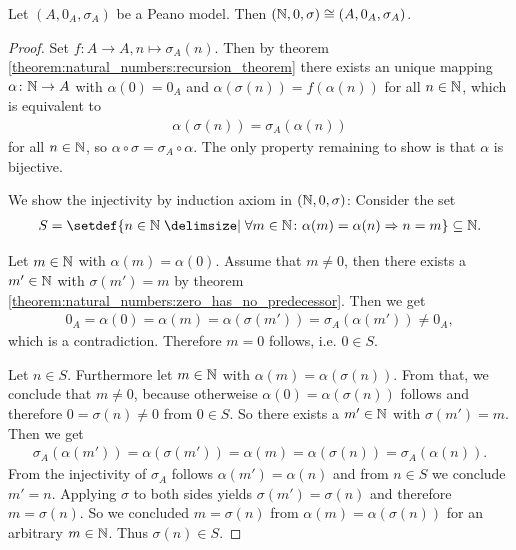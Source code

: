 \begin{theorem}
    Let $(A,0_A,\sigma_A)$ be a Peano model. Then $(\mathbb{N},0,\sigma)\cong(A,0_A,\sigma_A)$.
\end{theorem}

\begin{proof}
    Set $f\colon A\to A,n\mapsto\sigma_A(n)$. Then by theorem \ref{theorem:natural_numbers:recursion_theorem} there exists an unique mapping $\alpha\colon\mathbb{N}\to A$ with $\alpha(0)=0_A$ and $\alpha(\sigma(n))=f(\alpha(n))$ for all $n\in\mathbb{N}$, which is equivalent to \begin{align}\alpha(\sigma(n))=\sigma_A(\alpha(n))\end{align} for all $n\in\mathbb{N}$, so $\alpha\circ\sigma=\sigma_A\circ\alpha$. The only property remaining to show is that $\alpha$ is bijective.

     We show the injectivity by induction axiom in $(\mathbb{N},0,\sigma)$: Consider the set
    \begin{align}S=\setdef{n\in\setN\given \forall m\in\setN\colon \alpha(m)=\alpha(n)\Rightarrow n=m}\subseteq\setN.\end{align}
    
     Let $m\in\mathbb{N}$ with $\alpha(m)=\alpha(0)$. Assume that $m\neq 0$, then there exists a $m'\in\mathbb{N}$ with $\sigma(m')=m$ by theorem \ref{theorem:natural_numbers:zero_has_no_predecessor}. Then we get
    \begin{align}0_A=\alpha(0)=\alpha(m)=\alpha(\sigma(m'))=\sigma_A(\alpha(m'))\neq 0_A,\end{align}
    which is a contradiction. Therefore $m=0$ follows, i.e. $0\in S$.

     Let $n\in S$. Furthermore let $m\in\mathbb{N}$ with $\alpha(m)=\alpha(\sigma(n))$. From that, we conclude that $m\neq 0$, because otherweise $\alpha(0)=\alpha(\sigma(n))$ follows and therefore $0=\sigma(n)\neq 0$ from $0\in S$. So there exists a $m'\in\mathbb{N}$ with $\sigma(m')=m$. Then we get
    \begin{align}\sigma_A(\alpha(m'))=\alpha(\sigma(m'))=\alpha(m)=\alpha(\sigma(n))=\sigma_A(\alpha(n)).\end{align}
    From the injectivity of $\sigma_A$ follows $\alpha(m')=\alpha(n)$ and from $n\in S$ we conclude $m'=n$. Applying $\sigma$ to both sides yields $\sigma(m')=\sigma(n)$ and therefore $m=\sigma(n)$. So we concluded $m=\sigma(n)$ from $\alpha(m)=\alpha(\sigma(n))$ for an arbitrary $m\in\mathbb{N}$. Thus $\sigma(n)\in S$.


\end{proof}
